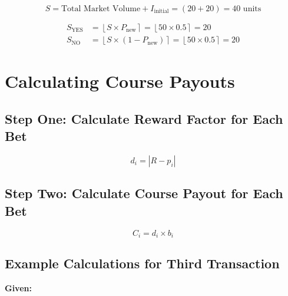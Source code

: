 \documentclass{article}
\begin{document}
\[
S = \text{Total Market Volume} + I_{\text{initial}} = (20 + 20) = 40 \text{ units}
\]

\begin{align*}
S_{\text{YES}} &= \left\lfloor S \times P_{\text{new}} \right\rceil = \left\lfloor 50 \times 0.5 \right\rceil = 20 \\
S_{\text{NO}} &= \left\lfloor S \times (1 - P_{\text{new}}) \right\rceil = \left\lfloor 50 \times 0.5 \right\rceil = 20
\end{align*}

\begin{center}

\end{center}


\section*{Calculating Course Payouts}

\subsection*{Step One: Calculate Reward Factor for Each Bet}

\[
d_i = |R - p_i|
\]

\subsection*{Step Two: Calculate Course Payout for Each Bet}

\[
C_i = d_i \times b_i
\]

\subsection*{Example Calculations for Third Transaction}

\textbf{Given:}
\end{document}
